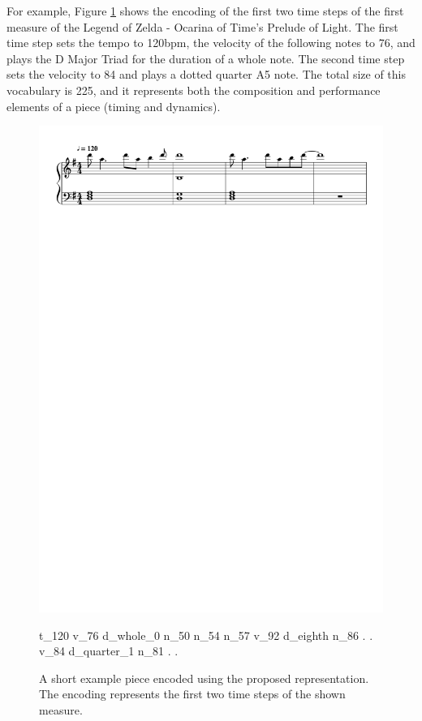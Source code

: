 For example, Figure \ref{fig:enc_ex} shows the encoding of the first two time steps of the first measure of the Legend of Zelda - Ocarina of Time's Prelude of Light. The first time step sets the tempo to 120bpm, the velocity of the following notes to 76, and plays the D Major Triad for the duration of a whole note. The second time step sets the velocity to 84 and plays a dotted quarter A5 note. The total size of this vocabulary is 225, and it represents both the composition and performance elements of a piece (timing and dynamics).

\begin{figure}[!h]
 \centering
 \includegraphics[width=.95\columnwidth]{imgs/ismir19/encoding.pdf}
\begin{spverbatim}
        t_120 v_76 d_whole_0 n_50 n_54 n_57 v_92 d_eighth n_86 . . v_84
        d_quarter_1 n_81 . .
\end{spverbatim}

 \caption{A short example piece encoded using the proposed representation. The encoding represents the first two time steps of the shown measure.}
 \label{fig:enc_ex}
\end{figure}


